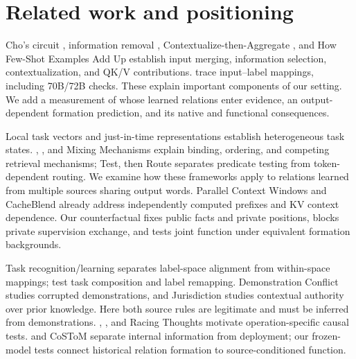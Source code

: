 \documentclass[11pt]{article}
\begin{document}
\section{Related work and positioning}\label{related-work-and-positioning}

Cho's circuit \citep{cho2025revisitingincontextlearninginference}, information removal \citep{cho2026mechanismtaskorientedinformationremoval}, Contextualize-then-Aggregate \citep{bakalova2025contextualizethenaggregatecircuitsincontextlearning}, and How Few-Shot Examples Add Up \citep{wang2026fewshotexamplesaddup} establish input merging, information selection, contextualization, and QK/V contributions. \citet{sun-etal-2025-interpret} trace input--label mappings, including 70B/72B checks. These explain important components of our setting. We add a measurement of whose learned relations enter evidence, an output-dependent formation prediction, and its native and functional consequences.

Local task vectors \citep{zheng-etal-2026-label} and just-in-time representations \citep{li2025justintimedistributedtaskrepresentations} establish heterogeneous task states. \citet{feng2024languagemodelsbindentities}, \citet{dai-etal-2024-representational}, and Mixing Mechanisms \citep{gurarieh2026mixingmechanismslanguagemodels} explain binding, ordering, and competing retrieval mechanisms; Test, then Route \citep{thavarasa2026testroutelanguagemodels} separates predicate testing from token-dependent routing. We examine how these frameworks apply to relations learned from multiple sources sharing output words. Parallel Context Windows \citep{ratner-etal-2023-parallel} and CacheBlend \citep{yao2025cacheblendfastlargelanguage} already address independently computed prefixes and KV context dependence. Our counterfactual fixes public facts and private positions, blocks private supervision exchange, and tests joint function under equivalent formation backgrounds.

Task recognition/learning \citep{yang2026localizingtaskrecognitiontask} separates label-space alignment from within-space mappings; \citet{li-etal-2024-language} test task composition and label remapping. Demonstration Conflict \citep{jiao2026understandingdynamicsdemonstrationconflict} studies corrupted demonstrations, and Jurisdiction \citep{li2026contextmisleadsincontextlearning} studies contextual authority over prior knowledge. Here both source rules are legitimate and must be inferred from demonstrations. \citet{yu-ananiadou-2024-large}, \citet{crosbie-shutova-2025-induction}, and Racing Thoughts \citep{lepori-etal-2025-racing} motivate operation-specific causal tests. \citet{lepori-etal-2026-language} and CoSToM \citep{li-etal-2026-costom} separate internal information from deployment; our frozen-model tests connect historical relation formation to source-conditioned function.
\end{document}
